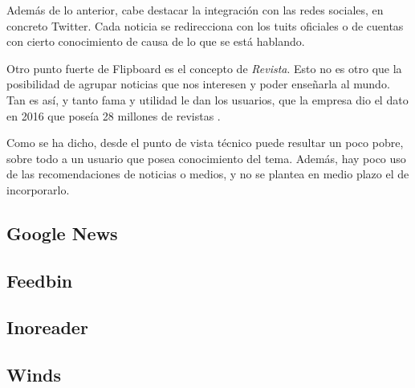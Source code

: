Además de lo anterior, cabe destacar la integración con las redes sociales, en concreto Twitter. Cada noticia se redirecciona con los tuits oficiales o de cuentas con cierto conocimiento de causa de lo que se está hablando.

Otro punto fuerte de Flipboard es el concepto de \textit{Revista}. Esto no es otro que la posibilidad de agrupar noticias que nos interesen y poder enseñarla al mundo. Tan es así, y tanto fama y utilidad le dan los usuarios, que la empresa dio el dato en 2016 que poseía 28 millones de revistas .

Como se ha dicho, desde el punto de vista técnico puede resultar un poco pobre, sobre todo a un usuario que posea conocimiento del tema. Además, hay poco uso de las recomendaciones de noticias o medios, y no se plantea en medio plazo el de incorporarlo.


\subsection{Google News}

\subsection{Feedbin}

\subsection{Inoreader}

\subsection{Winds}